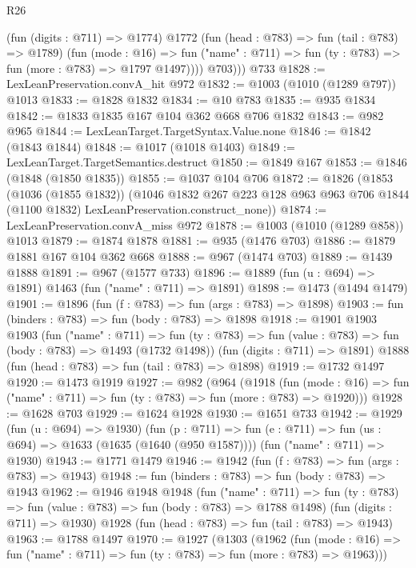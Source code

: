 \begin{lexlean}{R26}
\begin{coremodule}
              (fun (digits : @711) => @1774)
              @1772
              (fun (head : @783) => fun (tail : @783) => @1789)
              (fun (mode : @16) =>
              fun ("name" : @711) => fun (ty : @783) => fun (more : @783) => @1797 @1497))))
          @703)))
    @733
@1828 := LexLeanPreservation.convA_hit @972
@1832 := @1003 (@1010 (@1289 @797)) @1013
@1833 := @1828 @1832
@1834 := @10 @783
@1835 := @935 @1834
@1842 := @1833 @1835 @167 @104 @362 @668 @706 @1832
@1843 := @982 @965
@1844 := LexLeanTarget.TargetSyntax.Value.none
@1846 := @1842 (@1843 @1844)
@1848 := @1017 (@1018 @1403)
@1849 := LexLeanTarget.TargetSemantics.destruct
@1850 := @1849 @167
@1853 := @1846 (@1848 (@1850 @1835))
@1855 := @1037 @104 @706
@1872 := @1826
    (@1853
      (@1036 (@1855 @1832))
      (@1046
        @1832
        @267
        @223
        @128
        @963
        @963
        @706
        @1844
        (@1100 @1832)
        LexLeanPreservation.construct_none))
@1874 := LexLeanPreservation.convA_miss @972
@1878 := @1003 (@1010 (@1289 @858)) @1013
@1879 := @1874 @1878
@1881 := @935 (@1476 @703)
@1886 := @1879 @1881 @167 @104 @362 @668
@1888 := @967 (@1474 @703)
@1889 := @1439 @1888
@1891 := @967 (@1577 @733)
@1896 := @1889 (fun (u : @694) => @1891) @1463 (fun ("name" : @711) => @1891)
@1898 := @1473 (@1494 @1479)
@1901 := @1896 (fun (f : @783) => fun (args : @783) => @1898)
@1903 := fun (binders : @783) => fun (body : @783) => @1898
@1918 := @1901
    @1903
    @1903
    (fun ("name" : @711) =>
    fun (ty : @783) => fun (value : @783) => fun (body : @783) => @1493 (@1732 @1498))
    (fun (digits : @711) => @1891)
    @1888
    (fun (head : @783) => fun (tail : @783) => @1898)
@1919 := @1732 @1497
@1920 := @1473 @1919
@1927 := @982
    (@964
      (@1918
        (fun (mode : @16) => fun ("name" : @711) => fun (ty : @783) => fun (more : @783) => @1920)))
@1928 := @1628 @703
@1929 := @1624 @1928
@1930 := @1651 @733
@1942 := @1929
    (fun (u : @694) => @1930)
    (fun (p : @711) => fun (e : @711) => fun (us : @694) => @1633 (@1635 (@1640 (@950 @1587))))
    (fun ("name" : @711) => @1930)
@1943 := @1771 @1479
@1946 := @1942 (fun (f : @783) => fun (args : @783) => @1943)
@1948 := fun (binders : @783) => fun (body : @783) => @1943
@1962 := @1946
    @1948
    @1948
    (fun ("name" : @711) =>
    fun (ty : @783) => fun (value : @783) => fun (body : @783) => @1788 @1498)
    (fun (digits : @711) => @1930)
    @1928
    (fun (head : @783) => fun (tail : @783) => @1943)
@1963 := @1788 @1497
@1970 := @1927
    (@1303
      (@1962
        (fun (mode : @16) => fun ("name" : @711) => fun (ty : @783) => fun (more : @783) => @1963)))

\end{coremodule}
\end{lexlean}
